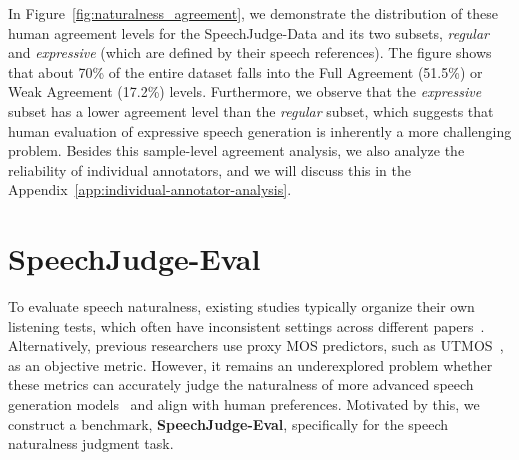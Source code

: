 \documentclass[]{bytedance_seed}
\begin{document}
In Figure~\ref{fig:naturalness_agreement}, we demonstrate the distribution of these human agreement levels for the SpeechJudge-Data and its two subsets, \textit{regular} and \textit{expressive} (which are defined by their speech references). The figure shows that about 70\% of the entire dataset falls into the Full Agreement (51.5\%) or Weak Agreement (17.2\%) levels. Furthermore, we observe that the \textit{expressive} subset has a lower agreement level than the \textit{regular} subset, which suggests that human evaluation of expressive speech generation is inherently a more challenging problem. Besides this sample-level agreement analysis, we also analyze the reliability of individual annotators, and we will discuss this in the Appendix~\ref{app:individual-annotator-analysis}.

\section{SpeechJudge-Eval}\label{sec:speechjudge-eval}
To evaluate speech naturalness, existing studies typically organize their own listening tests, which often have inconsistent settings across different papers~\citep{naturalspeech3,seedtts,cosyvoice,qwen2.5-omni,kimi-audio}. Alternatively, previous researchers use proxy MOS predictors, such as UTMOS~\citep{utmos}, as an objective metric. However, it remains an underexplored problem whether these metrics can accurately judge the naturalness of more advanced speech generation models~\citep{maskgct,cosyvoice2,f5tts,intp} and align with human preferences. Motivated by this, we construct a benchmark, \textbf{SpeechJudge-Eval}, specifically for the speech naturalness judgment task. 

\end{document}
